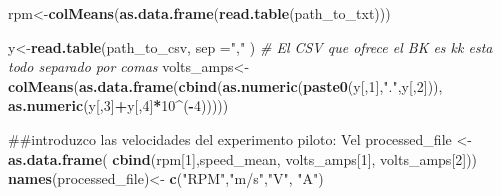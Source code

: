 \documentclass[]{article}
\newenvironment{Shaded}{\begin{snugshade}}{\end{snugshade}}
\newcommand{\KeywordTok}[1]{\textcolor[rgb]{0.13,0.29,0.53}{\textbf{#1}}}
\newcommand{\DataTypeTok}[1]{\textcolor[rgb]{0.13,0.29,0.53}{#1}}
\newcommand{\DecValTok}[1]{\textcolor[rgb]{0.00,0.00,0.81}{#1}}
\newcommand{\StringTok}[1]{\textcolor[rgb]{0.31,0.60,0.02}{#1}}
\newcommand{\CommentTok}[1]{\textcolor[rgb]{0.56,0.35,0.01}{\textit{#1}}}
\newcommand{\OperatorTok}[1]{\textcolor[rgb]{0.81,0.36,0.00}{\textbf{#1}}}
\newcommand{\NormalTok}[1]{#1}
\begin{document}
\begin{Shaded}
\begin{Highlighting}[]
  
  
\NormalTok{  rpm<-}\KeywordTok{colMeans}\NormalTok{(}\KeywordTok{as.data.frame}\NormalTok{(}\KeywordTok{read.table}\NormalTok{(path_to_txt)))}
  
\NormalTok{  y<-}\KeywordTok{read.table}\NormalTok{(path_to_csv, }\DataTypeTok{sep =}\StringTok{","}\NormalTok{ )}
  \CommentTok{# El CSV que ofrece el BK es kk esta todo separado por comas}
\NormalTok{  volts_amps<-}\StringTok{ }\KeywordTok{colMeans}\NormalTok{(}\KeywordTok{as.data.frame}\NormalTok{(}\KeywordTok{cbind}\NormalTok{(}\KeywordTok{as.numeric}\NormalTok{(}\KeywordTok{paste0}\NormalTok{(y[,}\DecValTok{1}\NormalTok{],}\StringTok{"."}\NormalTok{,y[,}\DecValTok{2}\NormalTok{])),}
                                            \KeywordTok{as.numeric}\NormalTok{(y[,}\DecValTok{3}\NormalTok{]}\OperatorTok{+}\NormalTok{y[,}\DecValTok{4}\NormalTok{]}\OperatorTok{*}\DecValTok{10}\OperatorTok{^}\NormalTok{(}\OperatorTok{-}\DecValTok{4}\NormalTok{)))))}
  
\NormalTok{  ##introduzco las velocidades del experimento piloto: Vel}
\NormalTok{  processed_file <-}\KeywordTok{as.data.frame}\NormalTok{( }\KeywordTok{cbind}\NormalTok{(rpm[}\DecValTok{1}\NormalTok{],speed_mean, volts_amps[}\DecValTok{1}\NormalTok{], volts_amps[}\DecValTok{2}\NormalTok{]))}
  \KeywordTok{names}\NormalTok{(processed_file)<-}\StringTok{ }\KeywordTok{c}\NormalTok{(}\StringTok{"RPM"}\NormalTok{,}\StringTok{"m/s"}\NormalTok{,}\StringTok{"V"}\NormalTok{, }\StringTok{"A"}\NormalTok{)}
  

\end{Highlighting}
\end{Shaded}
\end{document}
